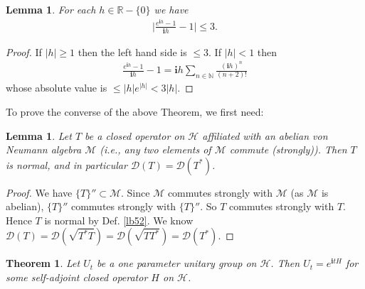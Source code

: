 \documentclass[12pt,b5paper,notitlepage]{article}
\theoremstyle{definition}
\theoremstyle{plain}
\newtheorem{thm}[df]{Theorem}
\newtheorem{lm}[df]{Lemma}
\newcommand{\mc}{\mathcal}
\newcommand{\Dom}{\scr D}
\newcommand{\scr}{\mathscr}
\newcommand{\im}{\mathbf{i}}
\newcommand{\Nbb}{\mathbb N}
\newcommand{\Rbb}{\mathbb R}
\numberwithin{equation}{section}
\begin{document}
\begin{lm}\label{lb51}
For each $h\in\Rbb-\{0\}$ we have
\begin{align*}
\Big|\frac{e^{\im h}-1}{\im h}-1\Big|\leq 3.	
\end{align*}
\end{lm}

\begin{proof}
If $|h|\geq 1$ then the left hand side is $\leq 3$. If $|h|<1$ then
\begin{align*}
\frac{e^{\im h}-1}{\im h}-1=\im h\sum_{n\in\Nbb}\frac{(\im h)^n}{(n+2)!} 	
\end{align*}
whose absolute value is $\leq |h| e^{|h|}<3|h|$.
\end{proof}

To prove the converse of the above Theorem, we first need:

\begin{lm}\label{lb53}
Let $T$ be a closed operator on $\mc H$ affiliated with an abelian von Neumann algebra $\mc M$ (i.e., any two elements of $\mc M$ commute (strongly)). Then $T$ is normal, and in particular $\Dom(T)=\Dom(T^*)$.
\end{lm}

\begin{proof}
We have $\{T\}''\subset\mc M$. Since $\mc M$ commutes strongly with $\mc M$ (as $\mc M$ is abelian),  $\{T\}''$ commutes strongly with $\{T\}''$. So $T$ commutes strongly with $T$. Hence $T$ is normal by Def. \ref{lb52}. We know $\Dom(T)=\Dom(\sqrt{T^*T})=\Dom(\sqrt{TT^*})=\Dom(T^*)$.
\end{proof}




\begin{thm}\label{lb54}
Let $U_t$ be a one parameter unitary group on $\mc H$. Then $U_t=e^{\im tH}$ for some self-adjoint closed operator $H$ on $\mc H$.
\end{thm}
\end{document}
